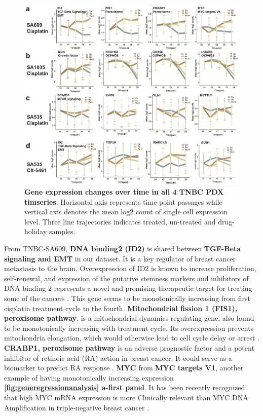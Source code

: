 \begin{figure}
\centering
 \includegraphics[width=\textwidth]{Figures/chap5/genelinetrajecregressionanalysis.png}
	
\caption[Gene expression changes over time]
	{\small
	 \textbf{Gene expression changes over time in all 4 TNBC PDX timseries}.
	Horizontal axis represents time point passages while vertical axis denotes the mean log2 count of single cell expression level. Three line trajectories indicates treated, un-treated and drug-holiday samples. }

	\label{fig:generegressionanalysis}
\end{figure}
 From TNBC-SA609, \textbf{DNA binding2 (ID2)} is shared between \textbf{TGF-Beta signaling and EMT} in our dataset. It is a key regulator of breast cancer metastasis to the brain. Overexpression of ID2 is known to increase proliferation, self-renewal, and expression of the putative stemness markers and inhibitors of DNA binding 2 represents a novel and promising therapeutic target for treating some of the cancers \cite{bae2017inhibitor, kijewska2019using}. This gene seems to be monotonically increasing from first cisplatin treatment cycle to the fourth. \textbf{Mitochondrial fission 1 (FIS1), peroxisome pathway}, is a mitochondrial dynamics-regulating gene, also found to be monotonically increasing with treatment cycle. Its overexpression prevents mitochondria elongation, which would otherwise lead to cell cycle delay or arrest \cite{fan2015mir, anderson2018dysregulation}. \textbf{CRABP1, peroxisome pathway} is an adverse prognostic factor and a potent inhibitor of retinoic acid (RA) action in breast cancer. It could serve as a biomarker to predict RA response \cite{liu2015crabp1}. \textbf{MYC} from \textbf{MYC targets V1}, another example of having monotonically increasing expression \textbf{\autoref{fig:generegressionanalysis} a-first panel}. It has been recently recognized that high MYC mRNA expression is more Clinically relevant than MYC DNA Amplification in triple-negative breast cancer \cite{chen2008myc, katsuta2020high}.

